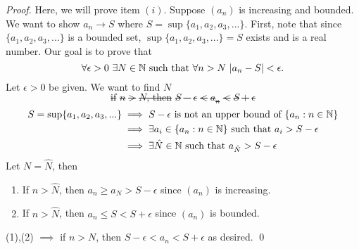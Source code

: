 \begin{proof}
    Here, we will prove item $(i)$.
    Suppose $(a_n)$ is increasing and bounded. We want to show $a_n \to S$ where $S = \sup\{a_1, a_2, a_3, ...\}$. First, note that since $\{a_1, a_2, a_3,...\}$ is a bounded set, $\sup\{a_1, a_2, a_3,...\}=S$ exists and is a real number. Our goal is to prove that
    $$\forall \epsilon > 0 ~\exists N \in \mathbb{N} \text{ such that } \forall n > N ~|a_n - S| < \epsilon.$$
    Let $\epsilon > 0$ be given. We want to find $N$ \st
    \begin{equation*}
        \text{if $n > N$, then $S-\epsilon < a_n < S + \epsilon$}
    \end{equation*}
    \begin{align*}
        S= \sup\{a_1, a_2, a_3,...\} &\implies S - \epsilon \text{ is not an upper bound of $\{a_n : n \in \mathbb{N}\}$} \\
        &\implies \exists a_i \in \{a_n : n \in \mathbb{N} \} \text{ such that } a_i > S - \epsilon \\
        &\implies \exists \hat{N} \in \mathbb{N} \text{ such that } a_{\hat{N}} > S - \epsilon
    \end{align*}
    Let $N=\hat{N}$, then
    \begin{enumerate}[(1)]
        \item If $n > \hat{N}$, then $a_n \geq a_N > S - \epsilon$ since $(a_n)$ is increasing.
        \item If $n > \hat{N}$, then $a_n \leq S < S+\epsilon$ since $(a_n)$ is bounded.
    \end{enumerate}
    (1),(2) $\implies$ if $n > N$, then $S-\epsilon < a_n < S + \epsilon$ as desired. \qed
\end{proof}

